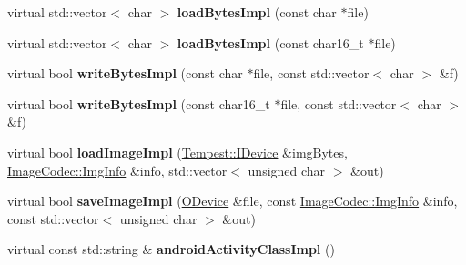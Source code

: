 \begin{DoxyCompactItemize}
\item 
\hypertarget{class_tempest_1_1_system_a_p_i_a2073d04e7e57a80c7e72dd58e656a86e}{virtual std\+::vector$<$ char $>$ {\bfseries load\+Bytes\+Impl} (const char $\ast$file)}\label{class_tempest_1_1_system_a_p_i_a2073d04e7e57a80c7e72dd58e656a86e}

\item 
\hypertarget{class_tempest_1_1_system_a_p_i_ac93041dd99cc0fb99d8e98bdc347682a}{virtual std\+::vector$<$ char $>$ {\bfseries load\+Bytes\+Impl} (const char16\+\_\+t $\ast$file)}\label{class_tempest_1_1_system_a_p_i_ac93041dd99cc0fb99d8e98bdc347682a}

\item 
\hypertarget{class_tempest_1_1_system_a_p_i_a018d6c35c8ea88a74f9f76bb6e9cd914}{virtual bool {\bfseries write\+Bytes\+Impl} (const char $\ast$file, const std\+::vector$<$ char $>$ \&f)}\label{class_tempest_1_1_system_a_p_i_a018d6c35c8ea88a74f9f76bb6e9cd914}

\item 
\hypertarget{class_tempest_1_1_system_a_p_i_a79002804b595021fe52c9a2027b43c48}{virtual bool {\bfseries write\+Bytes\+Impl} (const char16\+\_\+t $\ast$file, const std\+::vector$<$ char $>$ \&f)}\label{class_tempest_1_1_system_a_p_i_a79002804b595021fe52c9a2027b43c48}

\item 
\hypertarget{class_tempest_1_1_system_a_p_i_a568f1dd072c1a9cb3ecf583773ae0781}{virtual bool {\bfseries load\+Image\+Impl} (\hyperlink{class_tempest_1_1_i_device}{Tempest\+::\+I\+Device} \&img\+Bytes, \hyperlink{struct_tempest_1_1_pixmap_1_1_img_info}{Image\+Codec\+::\+Img\+Info} \&info, std\+::vector$<$ unsigned char $>$ \&out)}\label{class_tempest_1_1_system_a_p_i_a568f1dd072c1a9cb3ecf583773ae0781}

\item 
\hypertarget{class_tempest_1_1_system_a_p_i_a4ae75304aefe7108aa80e8bbaf7521ee}{virtual bool {\bfseries save\+Image\+Impl} (\hyperlink{class_tempest_1_1_o_device}{O\+Device} \&file, const \hyperlink{struct_tempest_1_1_pixmap_1_1_img_info}{Image\+Codec\+::\+Img\+Info} \&info, const std\+::vector$<$ unsigned char $>$ \&out)}\label{class_tempest_1_1_system_a_p_i_a4ae75304aefe7108aa80e8bbaf7521ee}

\item 
\hypertarget{class_tempest_1_1_system_a_p_i_adb50637da393272c0e262ba3dc71f1d3}{virtual const std\+::string \& {\bfseries android\+Activity\+Class\+Impl} ()}\label{class_tempest_1_1_system_a_p_i_adb50637da393272c0e262ba3dc71f1d3}


\end{DoxyCompactItemize}
